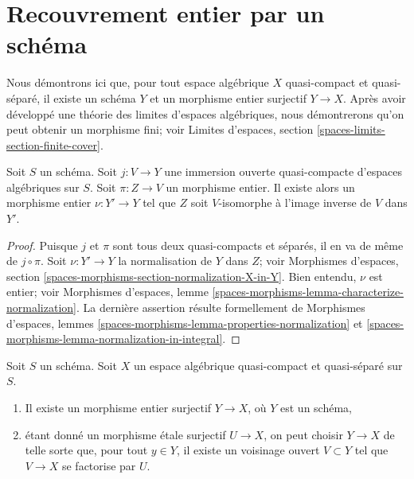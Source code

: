 \section{Recouvrement entier par un schéma}
\label{section-integral-cover}

\noindent
Nous démontrons ici que, pour tout espace algébrique $X$ quasi-compact et
quasi-séparé, il existe un schéma $Y$ et un morphisme entier surjectif
$Y \to X$. Après avoir développé une théorie des limites d'espaces
algébriques, nous démontrerons qu'on peut obtenir un morphisme fini; voir
Limites d'espaces, section \ref{spaces-limits-section-finite-cover}.

\begin{lemma}
\label{lemma-extend-integral-morphism}
Soit $S$ un schéma. Soit $j : V \to Y$ une immersion ouverte quasi-compacte
d'espaces algébriques sur $S$. Soit $\pi : Z \to V$ un morphisme entier.
Il existe alors un morphisme entier $\nu : Y' \to Y$ tel que $Z$ soit
$V$-isomorphe à l'image inverse de $V$ dans $Y'$.
\end{lemma}

\begin{proof}
Puisque $j$ et $\pi$ sont tous deux quasi-compacts et séparés, il en va de
même de $j \circ \pi$. Soit $\nu : Y' \to Y$ la normalisation de $Y$ dans
$Z$; voir Morphismes d'espaces, section
\ref{spaces-morphisms-section-normalization-X-in-Y}.
Bien entendu, $\nu$ est entier; voir
Morphismes d'espaces, lemme
\ref{spaces-morphisms-lemma-characterize-normalization}.
La dernière assertion résulte formellement de
Morphismes d'espaces, lemmes
\ref{spaces-morphisms-lemma-properties-normalization} et
\ref{spaces-morphisms-lemma-normalization-in-integral}.
\end{proof}

\begin{lemma}
\label{lemma-there-is-a-scheme-integral-over}
Soit $S$ un schéma. Soit $X$ un espace algébrique quasi-compact et
quasi-séparé sur $S$.
\begin{enumerate}
\item Il existe un morphisme entier surjectif $Y \to X$, où $Y$ est un
schéma,
\item étant donné un morphisme étale surjectif $U \to X$, on peut choisir
$Y \to X$ de telle sorte que, pour tout $y \in Y$, il existe un voisinage
ouvert $V \subset Y$ tel que $V \to X$ se factorise par $U$.
\end{enumerate}
\end{lemma}

